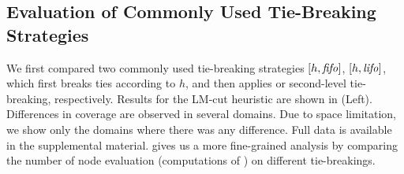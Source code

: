 
\subsection{Evaluation of  Commonly Used Tie-Breaking Strategies}
\label{sec:eval-common-strategies}

We first compared two commonly used tie-breaking strategies $[h,\mbox{\textit{fifo}}]$, $[h,\mbox{\textit{lifo}}]$, which
first breaks ties according to $h$, and then applies \fifo or \lifo
second-level tie-breaking, respectively.
Results for the LM-cut heuristic \cite{Helmert2009} are
shown in  (Left).
Differences in coverage are observed in several domains.
Due to space limitation, we show only the domains
where there was any difference. Full data is available in the
supplemental material. 
% 
 gives us a
more fine-grained analysis by comparing the number of node evaluation
(computations of \lmcut) on different tie-breakings.


\begin{table}[tb]
 \centering {}
 
 
 \caption{Experiments with 5 min, 2GB setting,
 comparing the coverages of \fifo and \lifo
 tie-breaking, with (left) and without (right) the
 conventional first-level $h$-based tie-breaking.  Due to space, 
only domains with results that differ are shown.
(Full results are
 available in the supplemental material.)
 }
 \label{single-coverage}
\end{table}


